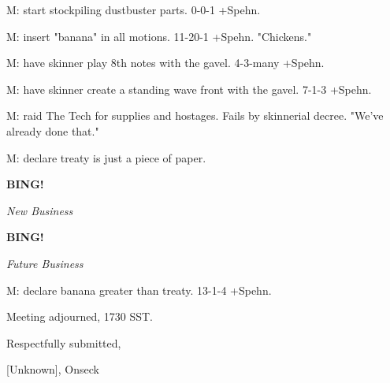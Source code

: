 \documentclass[12pt]{article}
\newcommand{\bing}{{\bf BING!} }
\newcommand{\goto}[1]{\bing \vskip 12pt \centerline{{\em{#1}}}}
\begin{document}
M: start stockpiling dustbuster parts. 0-0-1 +Spehn.

M: insert "banana" in all motions. 11-20-1 +Spehn. "Chickens."

M: have skinner play 8th notes with the gavel. 4-3-many +Spehn.

M: have skinner create a standing wave front with the gavel. 7-1-3 +Spehn.

M: raid The Tech for supplies and hostages. Fails by skinnerial decree. "We've already done that."

M: declare treaty is just a piece of paper.

\goto{New Business}

\goto{Future Business}

M: declare banana greater than treaty. 13-1-4 +Spehn.

\vspace{12pt}

\noindent
Meeting adjourned, 1730 SST.

\vspace{18pt}

\centerline{Respectfully submitted,}
\centerline{[Unknown], Onseck}
\end{document}
